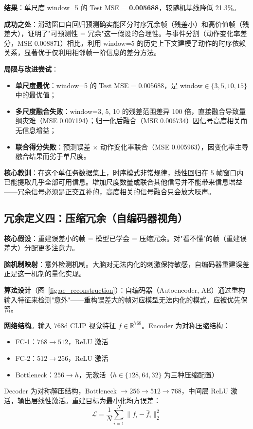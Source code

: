 \documentclass[12pt,a4paper]{article}
\begin{document}
\textbf{结果}：单尺度 window=5 的 Test MSE = \textbf{0.005688}，较随机基线降低 21.3\%。

\textbf{成功之处}：滑动窗口自回归预测确实能区分时序冗余帧（残差小）和高价值帧（残差大），证明了"可预测性 = 冗余"这一假设的合理性。与事件分割（动作变化率差分，MSE 0.008871）相比，利用 window=5 的历史上下文建模了动作的时序依赖关系，显著优于仅利用相邻帧一阶信息的差分方法。

\textbf{局限与改进尝试}：
\begin{itemize}[leftmargin=2em]
    \item \textbf{单尺度最优}：window=5 的 Test MSE = 0.005688，是 window$\in\{3,5,10,15\}$ 中的最优值；
    \item \textbf{多尺度融合失败}：window=3, 5, 10 的残差范围差异 100 倍，直接融合导致量纲灾难（MSE 0.007194）；归一化后融合（MSE 0.006734）因信号高度相关而无信息增益；
    \item \textbf{联合得分失败}：预测误差 $\times$ 动作变化率联合（MSE 0.005963），因变化率主导融合结果而劣于单尺度。
\end{itemize}

\textbf{核心教训}：在这个单任务数据集上，时序模式非常规律，线性回归在 5 帧窗口内已能提取几乎全部可用信息。增加尺度数量或联合其他信号并不能带来信息增益——冗余信号必须是正交互补的，高度相关的信号融合只会放大噪声。

\subsection{冗余定义四：压缩冗余（自编码器视角）}
\label{sec:ae}

\textbf{核心假设}：重建误差小的帧 = 模型已学会 = 压缩冗余。对"看不懂"的帧（重建误差大）分配更多注意力。

\textbf{脑机制映射}：意外检测机制。大脑对无法内化的刺激保持敏感，自编码器重建误差正是这一机制的量化实现。

\textbf{算法设计}（图~\ref{fig:ae_reconstruction}）：自编码器（Autoencoder, AE）通过重构输入特征来检测"意外"——重构误差大的帧对应模型无法内化的模式，应被优先保留。

\textbf{网络结构}。输入 768d CLIP 视觉特征 $f \in \mathbb{R}^{768}$。Encoder 为对称压缩结构：
\begin{itemize}[leftmargin=2em]
    \item FC-1：$768 \rightarrow 512$，ReLU 激活
    \item FC-2：$512 \rightarrow 256$，ReLU 激活
    \item Bottleneck：$256 \rightarrow h$，无激活（$h \in \{128, 64, 32\}$ 为三种压缩配置）
\end{itemize}
Decoder 为对称解压结构，Bottleneck $\rightarrow 256 \rightarrow 512 \rightarrow 768$，中间层 ReLU 激活，输出层线性激活。重建目标为最小化均方误差：
\begin{equation}
    \mathcal{L} = \frac{1}{N} \sum_{i=1}^{N} \|f_i - \hat{f}_i\|^2_2
\end{equation}
\end{document}
